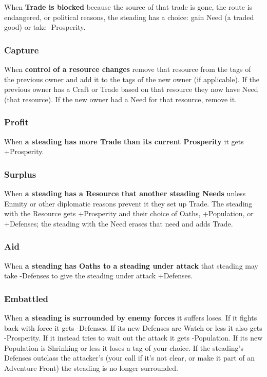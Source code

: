 When {\bf Trade is blocked}  because the source of that trade is gone, the route is endangered, or political reasons, the steading has a choice: gain Need (a traded good) or take -Prosperity.

 
\subsubsection{Capture}   
 

When {\bf control of a resource changes}  remove that resource from the tags of the previous owner and add it to the tags of the new owner (if applicable). If the previous owner has a Craft or Trade based on that resource they now have Need (that resource). If the new owner had a Need for that resource, remove it.

 
\subsubsection{Profit}   
 

When {\bf a steading has more Trade than its current Prosperity}  it gets +Prosperity.

 
\subsubsection{Surplus}   
 

When {\bf a steading has a Resource that another steading Needs}  unless Enmity or other diplomatic reasons prevent it they set up Trade. The steading with the Resource gets +Prosperity and their choice of Oaths, +Population, or +Defenses; the steading with the Need erases that need and adds Trade.

 
\subsubsection{Aid}   
 

When {\bf a steading has Oaths to a steading under attack}  that steading may take -Defenses to give the steading under attack +Defenses.

 
\subsubsection{Embattled}   
 

When {\bf a steading is surrounded by enemy forces}  it suffers loses. If it fights back with force it gets -Defenses. If its new Defenses are Watch or less it also gets -Prosperity. If it instead tries to wait out the attack it gets -Population. If its new Population is Shrinking or less it loses a tag of your choice. If the steading's Defenses outclass the attacker's (your call if it's not clear, or make it part of an Adventure Front) the steading is no longer surrounded.

